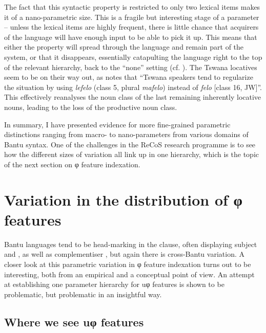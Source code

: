 \documentclass[output=paper]{langsci/langscibook}
\begin{document}
The fact that this syntactic property is restricted to only two lexical items
makes it of a nano-parametric size. This is a fragile but interesting stage of
a parameter – unless the lexical items are highly frequent, there is little
chance that acquirers of the language will have enough input to be able to pick
it up. This means that either the property will spread through the language and
remain part of the system, or that it disappears, essentially catapulting the
language right to the top of the relevant hierarchy, back to the \enquote{none} setting
(cf. \citealt{BibRob2016}). The Tswana locatives seem to be on their
way out, as \citet[36]{Creissels2011} notes that “Tswana speakers tend to
regularize the situation by using \emph{lefelo} (class 5, plural \emph{mafelo})
instead of \emph{felo} [class 16, JW]”. This effectively reanalyses the noun
class of the last remaining inherently locative nouns, leading to the loss of
the productive noun class.

In summary, I have presented evidence for more fine-grained parametric
distinctions ranging from macro- to nano-parameters from various domains of
Ban\-tu syntax. One of the challenges in the ReCoS research programme is to see
how the different sizes of variation all link up in one hierarchy, which is the
topic of the next section on φ feature indexation.

\section{Variation in the distribution of φ features}\label{sec:3.3}

Bantu languages tend to be head-marking in the clause, often displaying subject
and , as well as complementiser , but again there is
cross-Bantu variation. A closer look at this parametric variation in φ feature
indexation turns out to be interesting, both from an empirical and a conceptual
point of view. An attempt at establishing one parameter hierarchy for uφ
features is shown to be problematic, but problematic in an insightful way.

\subsection{Where we see uφ features}\label{sub:3.3.1}
\end{document}
